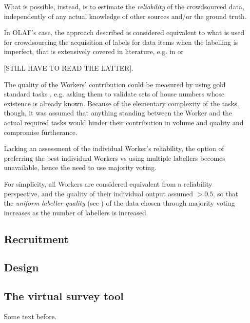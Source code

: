 \documentclass{llncs}
\begin{document}
What is possible, instead, is to estimate the \textit{reliability} of the crowdsourced data, independently of any actual knowledge of other sources and/or the ground truth. 

In OLAF's case, the approach described is considered equivalent to what is used for crowdsourcing the acquisition of labels for data items when the labelling is imperfect, that is extensively covered in literature, e.g. in \cite{sheng2008get} or \cite{Welinder:2010vkb}{[STILL HAVE TO READ THE LATTER{]}. 

The quality of the Workers' contribution could be measured by using gold standard tasks \cite{Oleson:2011tx}, e.g. asking them to validate sets of house numbers whose existence is already known. Because of the elementary complexity of the tasks, though, it was assumed that anything standing between the Worker and the actual required tasks would hinder their contribution in volume and quality and compromise furtherance.

Lacking an assessment of the individual Worker's reliability, the option of preferring the best individual Workers vs using multiple labellers becomes unavailable, hence the need to use majority voting. 

For simplicity, all Workers are considered equivalent from a reliability perspective, and the quality of their individual output assumed $ > 0.5 $, so that the \textit{uniform labeller quality} (see \cite{sheng2008get}) of the data chosen through majority voting increases as the number of labellers is increased.

\subsection{Recruitment}
\subsection{Design}
\subsection{The virtual survey tool}

Some text before.

}
\end{document}
